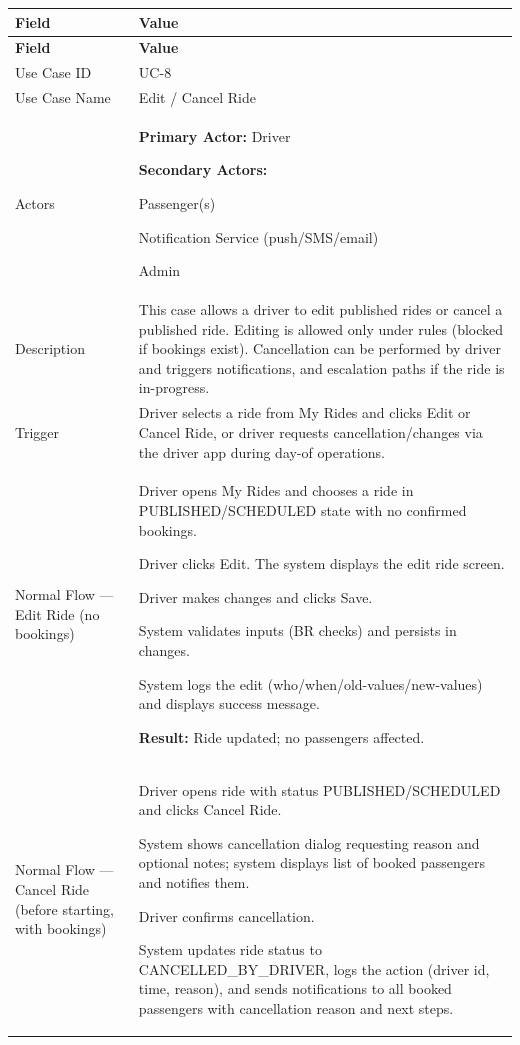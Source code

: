 \begin{longtable}{|p{3.5cm}|p{12cm}|}
\hline
\rowcolor{lightgray!30}
\textbf{Field} & \textbf{Value} \\
\hline
\endfirsthead
\hline
\rowcolor{lightgray!30}
\textbf{Field} & \textbf{Value} \\
\hline
\endhead
\hline
\endfoot
Use Case ID & UC-8 \\
\hline
Use Case Name & Edit / Cancel Ride \\
\hline
Actors &
\textbf{Primary Actor:} Driver

\textbf{Secondary Actors:}

Passenger(s)

Notification Service (push/SMS/email)

Admin \\
\hline
Description &
This case allows a driver to edit published rides or cancel a published ride. Editing is allowed only under rules (blocked if bookings exist). Cancellation can be performed by driver and triggers notifications, and escalation paths if the ride is in-progress. \\
\hline
Trigger &
Driver selects a ride from My Rides and clicks Edit or Cancel Ride, or driver requests cancellation/changes via the driver app during day-of operations. \\
\hline
Normal Flow — Edit Ride (no bookings) &
Driver opens My Rides and chooses a ride in PUBLISHED/SCHEDULED state with no confirmed bookings.

Driver clicks Edit. The system displays the edit ride screen.

Driver makes changes and clicks Save.

System validates inputs (BR checks) and persists in changes.

System logs the edit (who/when/old-values/new-values) and displays success message.

\textbf{Result:} Ride updated; no passengers affected. \\
\hline
Normal Flow — Cancel Ride (before starting, with bookings) &
Driver opens ride with status PUBLISHED/SCHEDULED and clicks Cancel Ride.

System shows cancellation dialog requesting reason and optional notes; system displays list of booked passengers and notifies them.

Driver confirms cancellation.

System updates ride status to CANCELLED\_BY\_DRIVER, logs the action (driver id, time, reason), and sends notifications to all booked passengers with cancellation reason and next steps.


\end{longtable}
